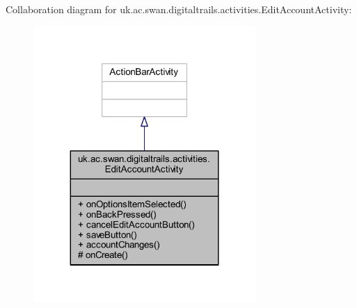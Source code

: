 Collaboration diagram for uk.\+ac.\+swan.\+digitaltrails.\+activities.\+Edit\+Account\+Activity\+:
\nopagebreak
\begin{figure}[H]
\begin{center}
\leavevmode
\includegraphics[width=239pt]{classuk_1_1ac_1_1swan_1_1digitaltrails_1_1activities_1_1_edit_account_activity__coll__graph}
\end{center}
\end{figure}
